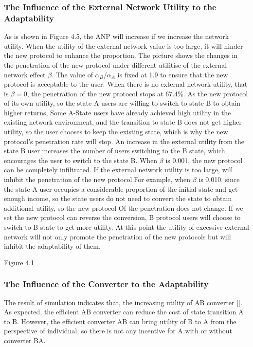 \documentclass{article}
\begin{document}
\subsubsection{The Influence of the External Network Utility to the Adaptability}
As is shown in Figure 4.5, the ANP will increase if we increase the network utility. When the utility of the external
network value is too large, it will hinder the new protocol to enhance the proportion. The picture shows the changes
in the penetration of the new protocol under different utilitise of the external network effect \(\beta\). The value of
$\alpha_{B}/\alpha_{A}$ is fixed at 1.9 to ensure that the new protocol is acceptable to the user. When there is no
external network utility, that is $\beta=0$, the penetration of the new protocol stops at 67.4\%. As the new protocol
of its own utility, so the state A users are willing to switch to state B to obtain higher returns, Some A-State users
have already achieved high utility in the existing network environment, and the transition to state B does not get higher
utility, so the user chooses to keep the existing state, which is why the new protocol's penetration rate will stop.
An increase in the external utility from the state B user increases the number of users switching to the B state, which
encourages the user to switch to the state B. When $\beta$ is 0.001, the new protocol can be completely infiltrated. If
the external network utility is too large, will inhibit the penetration of the new protocol.For example, when $\beta$ is
0.010, since the state A user occupies a considerable proportion of the initial state and get enough income, so the state
users do not need to convert the state to obtain additional utility, so the new protocol Of the penetration does not
change. If we set the new protocol can reverse the conversion, B protocol users will choose to switch to B state to get
more utility. At this point the utility of excessive external network will not only promote the penetration of the new
protocols but will inhibit the adaptability of them.

Figure 4.1
\subsubsection{The Influence of the Converter to the Adaptability}
The result of simulation indicates that, the increasing utility of AB converter []. As expected, the efficient AB
converter can reduce the cost of state transition A to B. However, the efficient converter AB can bring utility of
B to A from the perspective of individual, so there is not any incentive for A with or without converter BA.
\end{document}
